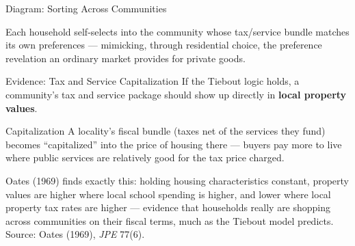 \documentclass[11pt,aspectratio=169]{beamer}
\newcommand{\srcnote}[1]{{\footnotesize\color{wugray}Source: #1}}
\begin{document}
\begin{frame}{Diagram: Sorting Across Communities}
  \begin{center}
  \end{center}
  \footnotesize Each household self-selects into the community whose tax/service bundle matches its own preferences --- mimicking, through residential choice, the preference revelation an ordinary market provides for private goods.
\end{frame}

\begin{frame}{Evidence: Tax and Service Capitalization}
  If the Tiebout logic holds, a community's tax and service package should show up directly in \textbf{local property values}.
  \begin{block}{Capitalization}
    A locality's fiscal bundle (taxes net of the services they fund) becomes ``capitalized'' into the price of housing there --- buyers pay more to live where public services are relatively good for the tax price charged.
  \end{block}
  \small Oates (1969) finds exactly this: holding housing characteristics constant, property values are higher where local school spending is higher, and lower where local property tax rates are higher --- evidence that households really are shopping across communities on their fiscal terms, much as the Tiebout model predicts.\\
  \srcnote{Oates (1969), \emph{JPE} 77(6).}
\end{frame}
\end{document}
